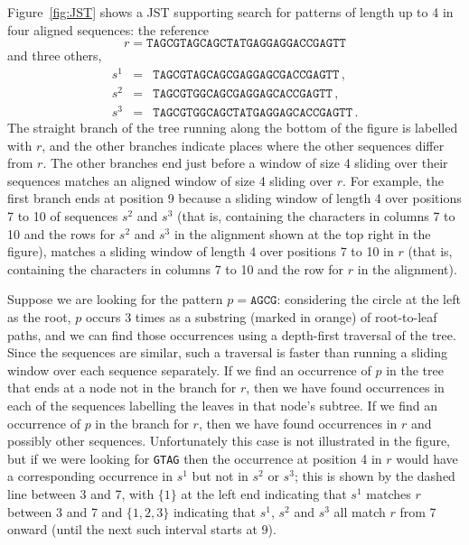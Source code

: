 Figure~\ref{fig:JST} shows a JST supporting search for patterns of length up to 4 in four aligned sequences: the reference
\[r = \mathtt{TAGCGTAGCAGCTATGAGGAGGACCGAGTT}\]
and three others,
\begin{eqnarray*}
s^1 & = & \mathtt{TAGCGTAGCAGCGAGGAGCGACCGAGTT}\,,\\
s^2 & = &  \mathtt{TAGCGTGGCAGCGAGGAGCACCGAGTT}\,,\\
s^3 & = & \mathtt{TAGCGTGGCAGCTATGAGGAGCACCGAGTT}\,.
\end{eqnarray*}
The straight branch of the tree running along the bottom of the figure is labelled with $r$, and the other branches indicate places where the other sequences differ from $r$.  The other branches end just before a window of size 4 sliding over their sequences matches an aligned window of size 4 sliding over $r$.  For example, the first branch ends at position 9 because a sliding window of length 4 over positions 7 to 10 of sequences $s^2$ and $s^3$ (that is, containing the characters in columns 7 to 10 and the rows for $s^2$ and $s^3$ in the alignment shown at the top right in the figure), matches a sliding window of length 4 over positions 7 to 10 in $r$ (that is, containing the characters in columns 7 to 10 and the row for $r$ in the alignment).

Suppose we are looking for the pattern $p = \mathtt{AGCG}$: considering the circle at the left as the root, $p$ occurs 3 times as a substring (marked in orange) of root-to-leaf paths, and we can find those occurrences using a depth-first traversal of the tree.  Since the sequences are similar, such a traversal is faster than running a sliding window over each sequence separately.  If we find an occurrence of $p$ in the tree that ends at a node not in the branch for $r$, then we have found occurrences in each of the sequences labelling the leaves in that node's subtree.  If we find an occurrence of $p$ in the branch for $r$, then we have found occurrences in $r$ and possibly other sequences.  Unfortunately this case is not illustrated in the figure, but if we were looking for {\tt GTAG} then the occurrence at position 4 in $r$ would have a corresponding occurrence in $s^1$ but not in $s^2$ or $s^3$; this is shown by the dashed line between 3 and 7, with $\{1\}$ at the left end indicating that $s^1$ matches $r$ between 3 and 7 and $\{1, 2, 3\}$ indicating that $s^1$, $s^2$ and $s^3$ all match $r$ from 7 onward (until the next such interval starts at 9).

